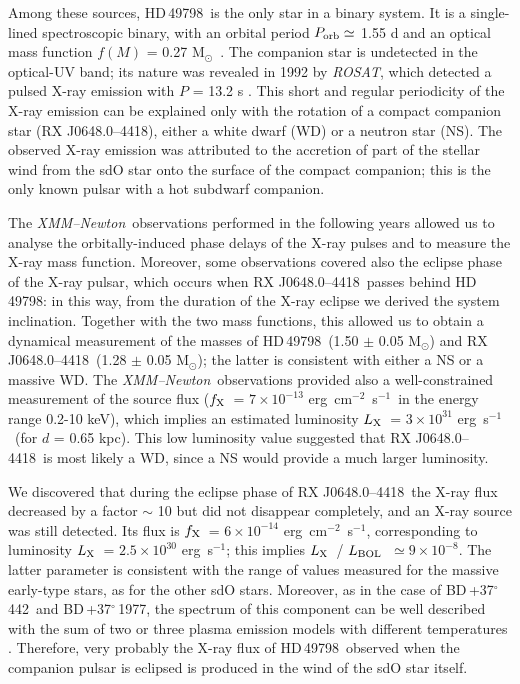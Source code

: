 \documentclass[USenglish,twocolumn]{article}
\def\XMM{{\em XMM--Newton}}
\def\ROSAT{{\em ROSAT}}
\def\BDone{BD\,+37$^\circ$\,442}
\def\BDtwo{BD\,+37$^\circ$\,1977}
\def\RX{RX J0648.0--4418}
\def\HDone{HD\,49798}
\def\flux {\mbox{erg cm$^{-2}$ s$^{-1}$}}
\def\lum {\mbox{erg s$^{-1}$}}
\def\lx {$L_{\rm X}$}
\def\fx {$f_{\rm X}$}
\def\lbol {$L_{\rm BOL}$}
\def\msole{M$_{\odot}$}
\begin{document}
Among these sources, \HDone\ is the only star in a binary system. It is a single-lined spectroscopic binary, with an orbital period $P_{\rm orb} \simeq$ 1.55 d and an optical mass function $f(M)$ = 0.27 \msole\ \citep{Thackeray70,SticklandLloyd94}. The companion star is undetected in the optical-UV band; its nature was revealed in 1992 by \ROSAT, which detected a pulsed X-ray emission with $P$ = 13.2 s \citep{Israel+97}. This short and regular periodicity of the X-ray emission can be explained only with the rotation of a compact companion star (\RX), either a white dwarf (WD) or a neutron star (NS). The observed X-ray emission was attributed to the accretion of part of the stellar wind from the sdO star onto the surface of the compact companion; this is the only known pulsar with a hot subdwarf companion.

The \XMM\ observations performed in the following years \citep{Mereghetti+09,Mereghetti+11b,Mereghetti+13} allowed us to analyse the orbitally-induced phase delays of the X-ray pulses and to measure the X-ray mass function. Moreover, some observations covered also the eclipse phase of the X-ray pulsar, which occurs when \RX\ passes behind \HDone: in this way, from the duration of the X-ray eclipse we derived the system inclination. Together with the two mass functions, this allowed us to obtain a dynamical measurement of the masses of \HDone\ (1.50 $\pm$ 0.05 \msole) and \RX\ (1.28 $\pm$ 0.05 \msole); the latter is consistent with either a NS or a massive WD. The \XMM\ observations provided also a well-constrained measurement of the source flux (\fx\ = $7\times 10^{-13}$ \flux\ in the energy range 0.2-10 keV), which implies an estimated luminosity \lx\ = $3\times 10^{31}$ \lum\ (for $d$ = 0.65 kpc). This low luminosity value suggested that \RX\ is most likely a WD, since a NS would provide a much larger luminosity.

We discovered that during the eclipse phase of \RX\ the X-ray flux decreased by a factor $\sim$ 10 but did not disappear completely, and an X-ray source was still detected. Its flux is \fx\ = $6\times 10^{-14}$ \flux, corresponding to luminosity \lx\ = $2.5\times 10^{30}$ \lum; this implies \lx\ / \lbol\ $\simeq 9\times10^{-8}$. The latter parameter is consistent with the range of values measured for the massive early-type stars, as for the other sdO stars. Moreover, as in the case of \BDone\ and \BDtwo, the spectrum of this component can be well described with the sum of two or three plasma emission models with different temperatures \citep{Mereghetti+16}. Therefore, very probably the X-ray flux of \HDone\ observed when the companion pulsar is eclipsed is produced in the wind of the sdO star itself.
\end{document}
